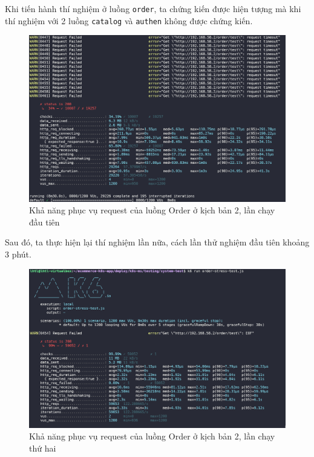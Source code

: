 \noindent Khi tiến hành thí nghiệm ở luồng \lstinline|order|, ta chứng kiến được hiện tượng mà khi thí nghiệm với 2 luồng \lstinline|catalog| và \lstinline|authen| không được chứng kiến.
\begin{figure}[H]
  \begin{center}
      \includegraphics[scale = 0.65]{images/hanh/fullflow-test/order-hpa-fst-time}
      \vspace*{1mm}
  \end{center}
  \caption{Khả năng phục vụ request của luồng Order ở kịch bản 2, lần chạy đầu tiên}
  \label{fig:fullflow-order-with-hpa-fst-time}

\end{figure}

Sau đó, ta thực hiện lại thí nghiệm lần nữa, cách lần thử nghiệm đầu tiên khoảng 3 phút. 

\begin{figure}[H]
  \begin{center}
      \includegraphics[scale = 0.65]{images/hanh/fullflow-test/order-hpa-snd-time}
      \vspace*{1mm}
  \end{center}
  \caption{Khả năng phục vụ request của luồng Order ở kịch bản 2, lần chạy thứ hai}
  \label{fig:fullflow-order-with-hpa-snd-time}

\end{figure}

